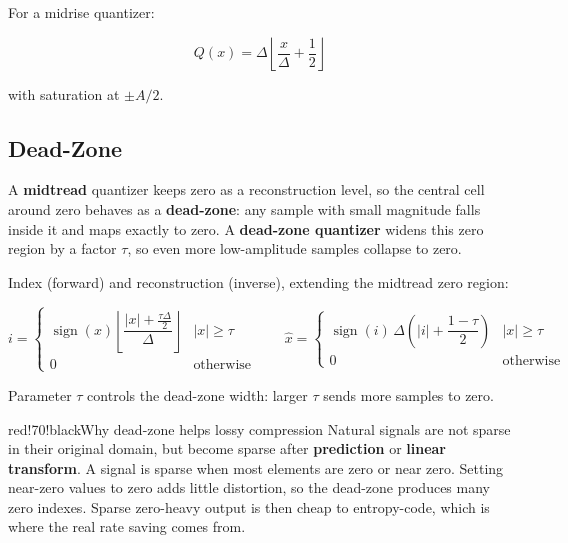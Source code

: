 For a midrise quantizer:

\[
Q(x)=\Delta\left\lfloor\frac{x}{\Delta}+\frac{1}{2}\right\rfloor
\]

with saturation at $\pm A/2$.

\begin{center}
\end{center}

\subsection{Dead-Zone}

A \textbf{midtread} quantizer keeps zero as a reconstruction level, so the central cell around zero behaves as a \textbf{dead-zone}: any sample with small magnitude falls inside it and maps exactly to zero. A \textbf{dead-zone quantizer} widens this zero region by a factor $\tau$, so even more low-amplitude samples collapse to zero.

Index (forward) and reconstruction (inverse), extending the midtread zero region:

\[
i=
\begin{cases}
\operatorname{sign}(x)\left\lfloor\dfrac{|x|+\frac{\tau\Delta}{2}}{\Delta}\right\rfloor & |x|\geq\tau\\
0 & \text{otherwise}
\end{cases}
\qquad
\hat{x}=
\begin{cases}
\operatorname{sign}(i)\,\Delta\left(|i|+\dfrac{1-\tau}{2}\right) & |x|\geq\tau\\
0 & \text{otherwise}
\end{cases}
\]

Parameter $\tau$ controls the dead-zone width: larger $\tau$ sends more samples to zero.

\begin{calloutbox}{red!70!black}{Why dead-zone helps lossy compression}
Natural signals are not sparse in their original domain, but become sparse after \textbf{prediction} or \textbf{linear transform}. A signal is sparse when most elements are zero or near zero. Setting near-zero values to zero adds little distortion, so the dead-zone produces many zero indexes. Sparse zero-heavy output is then cheap to entropy-code, which is where the real rate saving comes from.
\end{calloutbox}

